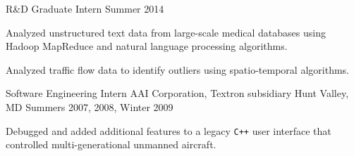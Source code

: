 \begin{cventries}
  \cventry
    {R\&D Graduate Intern} %
    {} %
    {} %
    {Summer 2014} %
    {
      \begin{cvitems} %
      \item {Analyzed unstructured text data from large-scale medical
        databases using Hadoop MapReduce and natural language processing
        algorithms.}
      \item {Analyzed traffic flow data to identify outliers using spatio-temporal
        algorithms.}
      \end{cvitems}
    }

  \cventry
    {Software Engineering Intern} %
    {AAI Corporation, Textron subsidiary} %
    {Hunt Valley, MD} %
    {Summers 2007, 2008, Winter 2009} %
    {
      \begin{cvitems} %
      \item {Debugged and added additional features to a legacy {\texttt{C++}} user
          interface that controlled multi-generational unmanned aircraft.}
      \end{cvitems}
    }

\end{cventries}
